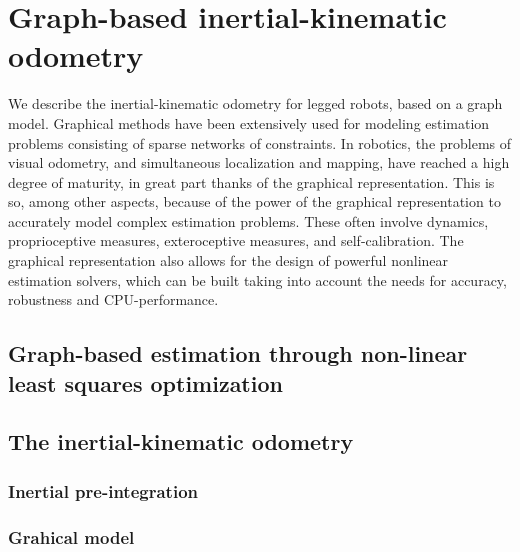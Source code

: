 
\section{Graph-based inertial-kinematic odometry}

We describe the inertial-kinematic odometry for legged robots, based on a graph model. 
Graphical methods have been extensively used for modeling estimation problems consisting of sparse networks of constraints. 
In robotics, the problems of visual odometry, and simultaneous localization and mapping, have reached a high degree of maturity, in great part thanks of the graphical representation. 
This is so, among other aspects, because of the power of the graphical representation to accurately model complex estimation problems. 
These often involve dynamics, proprioceptive measures, exteroceptive measures, and self-calibration. 
The graphical representation also allows for the design of powerful nonlinear estimation solvers, which can be built taking into account the needs for accuracy, robustness and CPU-performance.

\subsection{Graph-based estimation through non-linear least squares optimization}

\subsection{The inertial-kinematic odometry}

\subsubsection{Inertial pre-integration}

\subsubsection{Grahical model}

